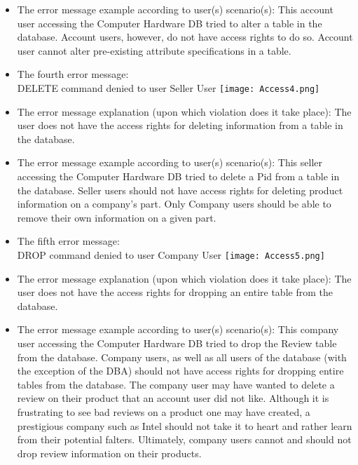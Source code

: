 {\begin{itemize}
\begin{itemize}
	\item{The error message example according to user(s) scenario(s): }
	This account user accessing the Computer Hardware DB tried to alter a table in the database. Account users, however, do not have access rights to do so. Account user cannot alter pre-existing attribute specifications in a table.
	 \end{itemize}
	 	 \begin{itemize} 
	\item{The fourth error message: }
	\\DELETE command denied to user Seller User
		\texttt{[image: Access4.png]}
	\item{The error message explanation (upon which violation does it take place): }
	The user does not have the access rights for deleting information from a table in the database. 
	\item{The error message example according to user(s) scenario(s): }
	This seller accessing the Computer Hardware DB tried to delete a Pid from a table in the database. Seller users should not have access rights for deleting product information on a company's part. Only Company users should be able to remove their own information on a given part.
	 \end{itemize}
	 \begin{itemize} 
	\item{The fifth error message: }
	\\DROP command denied to user Company User
		\texttt{[image: Access5.png]}
	\item{The error message explanation (upon which violation does it take place): }
	The user does not have the access rights for dropping an entire table from the database.
	\item{The error message example according to user(s) scenario(s): }
	This company user accessing the Computer Hardware DB tried to drop the Review table from the database. Company users, as well as all users of the database (with the exception of the DBA) should not have access rights for dropping entire tables from the database. The company user may have wanted to delete a review on their product that an account user did not like. Although it is frustrating to see bad reviews on a product one may have created, a prestigious company such as Intel should not take it to heart and rather learn from their potential falters. Ultimately, company users cannot and should not drop review information on their products.
	 \end{itemize}

\end{itemize}}
